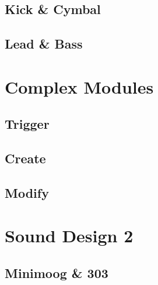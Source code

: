 \documentclass[
]{book}
\begin{document}
\hypertarget{kick-cymbal}{%
\chapter{Kick \& Cymbal}\label{kick-cymbal}}

\hypertarget{lead-bass}{%
\chapter{Lead \& Bass}\label{lead-bass}}

\hypertarget{part-complex-modules}{%
\part{Complex Modules}\label{part-complex-modules}}

\hypertarget{trigger-1}{%
\chapter{Trigger}\label{trigger-1}}

\hypertarget{create-1}{%
\chapter{Create}\label{create-1}}

\hypertarget{modify-1}{%
\chapter{Modify}\label{modify-1}}

\hypertarget{part-sound-design-2}{%
\part{Sound Design 2}\label{part-sound-design-2}}

\hypertarget{minimoog-303}{%
\chapter{Minimoog \& 303}\label{minimoog-303}}

  
\end{document}
